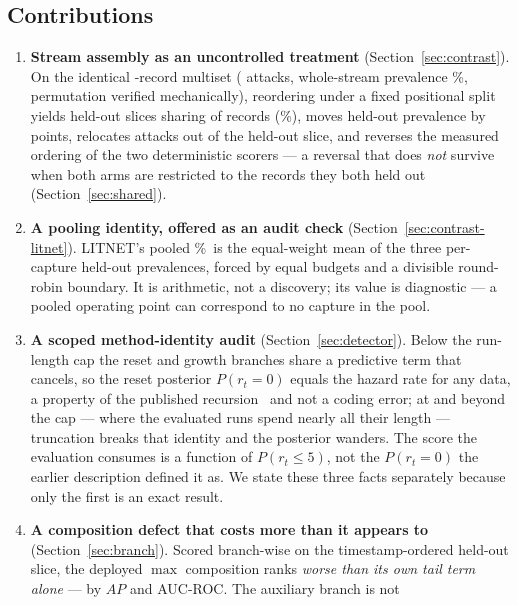 \documentclass[manuscript,screen,nonacm]{acmart}
\begin{document}
\subsection*{Contributions}
\begin{enumerate}
\item \textbf{Stream assembly as an uncontrolled treatment}
(Section~\ref{sec:contrast}). On the identical \CicidsArmRows-record multiset
(\CicidsArmAttacks{} attacks, whole-stream prevalence
\CicidsArmPrevalencePct\%, permutation verified mechanically), reordering under
a fixed positional split yields held-out slices sharing
\CicidsHeldoutOverlap{} of \CicidsHeldoutSize{} records
(\CicidsHeldoutOverlapPct\%), moves held-out prevalence by
\SFourCicidsPrevShiftAbsPp{} points, relocates
\CicidsAttacksMovedOutOfHeldout{} attacks out of the held-out slice, and
reverses the measured ordering of the two deterministic scorers ---
a reversal that does \emph{not} survive when both arms are restricted to the
records they both held out (Section~\ref{sec:shared}).
\item \textbf{A pooling identity, offered as an audit check}
(Section~\ref{sec:contrast-litnet}). LITNET's pooled
\SFourLitnetPooledTestPrev\%\ is the equal-weight mean of the three per-capture
held-out prevalences, forced by equal budgets and a divisible round-robin
boundary. It is arithmetic, not a discovery; its value is diagnostic --- a
pooled operating point can correspond to no capture in the pool.
\item \textbf{A scoped method-identity audit} (Section~\ref{sec:detector}).
Below the run-length cap the reset and growth branches share a predictive term
that cancels, so the reset posterior $P(r_t{=}0)$ equals the hazard rate for
any data, a property of the published recursion~\citep{adams2007bocpd} and not
a coding error; at and beyond the cap --- where the evaluated runs spend
nearly all their length --- truncation breaks that identity and the posterior
wanders. The score the evaluation consumes is a function of $P(r_t\le5)$, not
the $P(r_t{=}0)$ the earlier description defined it as. We state these three
facts separately because only the first is an exact result.
\item \textbf{A composition defect that costs more than it appears to}
(Section~\ref{sec:branch}). Scored branch-wise on the timestamp-ordered
held-out slice, the deployed $\max$ composition ranks \emph{worse than its own
tail term alone} --- by \RevBranchTailMinusCombinedAucpr{} $AP$ and
\RevBranchTailMinusCombinedAucroc{} AUC-ROC. The auxiliary branch is not

\end{enumerate}
\end{document}
